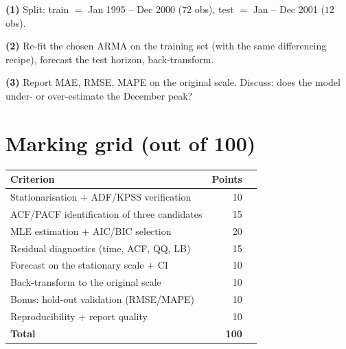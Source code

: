\documentclass[a4paper,11pt]{article}
\begin{document}
\begin{exercise}
\textbf{(1)} Split: train $=$ Jan 1995 -- Dec 2000 ($72$ obs),
test $=$ Jan -- Dec 2001 ($12$ obs).

\textbf{(2)} Re-fit the chosen ARMA on the training set (with the
same differencing recipe), forecast the test horizon, back-transform.

\textbf{(3)} Report MAE, RMSE, MAPE on the original scale. Discuss:
does the model under- or over-estimate the December peak?
\end{exercise}

\section*{Marking grid (out of 100)}

\begin{center}
\begin{tabular}{p{8cm}rl}
\toprule
\textbf{Criterion} & \textbf{Points} & \\
\midrule
Stationarisation $+$ ADF/KPSS verification        & 10 \\
ACF/PACF identification of three candidates       & 15 \\
MLE estimation $+$ AIC/BIC selection              & 20 \\
Residual diagnostics (time, ACF, QQ, LB)          & 15 \\
Forecast on the stationary scale + CI             & 10 \\
Back-transform to the original scale              & 10 \\
Bonus: hold-out validation (RMSE/MAPE)            & 10 \\
Reproducibility + report quality                  & 10 \\
\midrule
\textbf{Total}                                    & \textbf{100} \\
\bottomrule
\end{tabular}
\end{center}

\bigskip
\hfill\auteurNom\par
\hfill\auteurEmail\par
\end{document}
